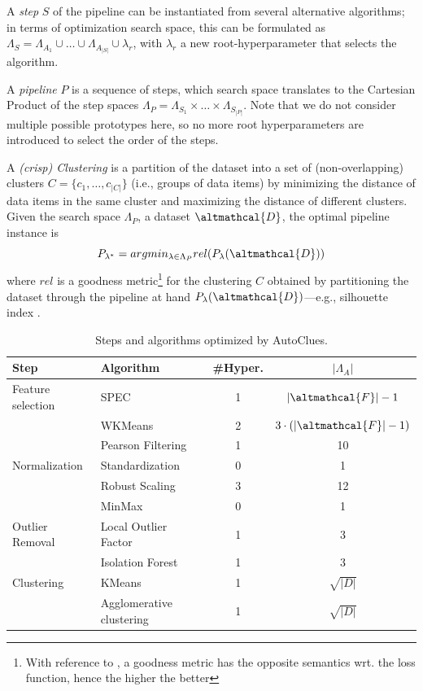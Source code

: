 A \textit{step} $S$ of the pipeline can be instantiated from several alternative algorithms; in terms of optimization search space, this can be formulated as $\Lambda_S = \Lambda_{A_1} \cup \ldots \cup \Lambda_{A_{|S|}} \cup \lambda_r$, with $\lambda_r$ a new root-hyperparameter that selects the algorithm.

A \textit{pipeline} $P$ is a sequence of steps, which search space translates to the Cartesian Product of the step spaces $\Lambda_P = \Lambda_{S_1} \times \ldots \times \Lambda_{S_{|P|}}$.
Note that we do not consider multiple possible prototypes here, so no more root hyperparameters are introduced to select the order of the steps.

A \textit{(crisp) Clustering} is a partition of the dataset into a set of (non-overlapping) clusters  $C=\{c_1, \ldots, c_{|C|}\}$ (i.e., groups of data items) by minimizing the distance of data items in the same cluster and maximizing the distance of different clusters.
Given the search space $\Lambda_P$, a dataset $\altmathcal{D}$, the optimal pipeline instance is
\begin{equation}
\label{eq:optimization}
    P_{\lambda^*} = argmin_{\lambda \in \Lambda_P} rel(P_{\lambda}(\altmathcal{D}))
\end{equation}
where $rel$ is a goodness metric\footnote{With reference to , a goodness metric has the opposite semantics wrt. the loss function, hence the higher the better} for the clustering $C$ obtained by partitioning the dataset through the pipeline at hand $P_{\lambda}(\altmathcal{D})$---e.g., silhouette index \cite{zhu2010clustering}.


\begin{table}[!ht]
    \centering
    \begin{tabular}{lp{5cm}cc}
        \hline
        Step     & Algorithm & \#Hyper. & $|\Lambda_A|$\\\hline
        Feature selection & SPEC \cite{zhao2007spectral} & 1 & $|\altmathcal{F}|-1$\\
         & WKMeans \cite{WKMeans} & 2 & $3 \cdot (|\altmathcal{F}|-1)$\\
         & Pearson Filtering & 1 & 10\\
        Normalization     & Standardization & 0 & 1\\
        & Robust Scaling & 3 & 12\\
        & MinMax & 0 & 1\\
        Outlier Removal   & Local Outlier Factor \cite{breunig2000lof} & 1 & 3\\
        & Isolation Forest \cite{liu2012isolation} & 1 & 3\\
        Clustering  & KMeans \cite{arthur2006k} & 1 & $\sqrt{|D|}$\\
        & Agglomerative clustering  \cite{murtagh2017algorithms} & 1 & $\sqrt{|D|}$\\\hline
    \end{tabular}
    \caption{Steps and algorithms optimized by AutoClues.}
    \label{clustering-tbl:processing}
\end{table}


